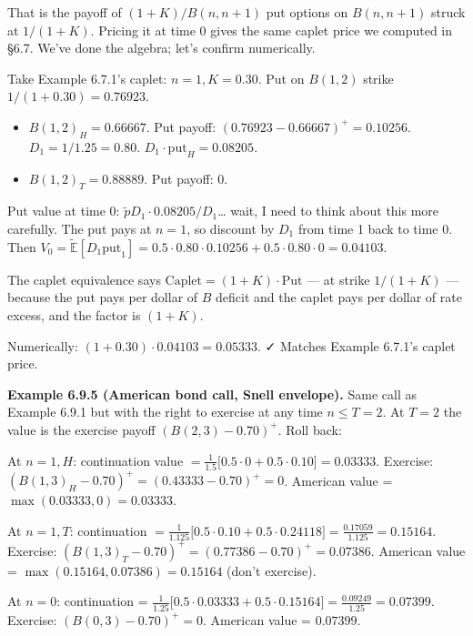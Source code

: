 \documentclass[
  10pt,
  twoside]{book}
\providecommand{\tightlist}{%
  \setlength{\itemsep}{0pt}\setlength{\parskip}{0pt}}
\begin{document}
That is the payoff of \((1 + K)/B(n, n+1)\) put options on \(B(n, n+1)\)
struck at \(1/(1 + K)\). Pricing it at time 0 gives the same caplet
price we computed in §6.7. We've done the algebra; let's confirm
numerically.

Take Example 6.7.1's caplet: \(n = 1, K = 0.30\). Put on \(B(1, 2)\)
strike \(1/(1 + 0.30) = 0.76923\).

\begin{itemize}
\tightlist
\item
  \(B(1, 2)_H = 0.66667\). Put payoff:
  \((0.76923 - 0.66667)^+ = 0.10256\). \(D_1 = 1/1.25 = 0.80\).
  \(D_1 \cdot \text{put}_H = 0.08205\).
\item
  \(B(1, 2)_T = 0.88889\). Put payoff: \(0\).
\end{itemize}

Put value at time 0: \(\tilde p D_1 \cdot 0.08205 / D_1\)\ldots{} wait,
I need to think about this more carefully. The put pays at \(n = 1\), so
discount by \(D_1\) from time 1 back to time 0. Then
\(V_0 = \tilde{\mathbb E}[D_1 \text{put}_1] = 0.5 \cdot 0.80 \cdot 0.10256 + 0.5 \cdot 0.80 \cdot 0 = 0.04103\).

The caplet equivalence says \(\text{Caplet} = (1 + K) \cdot \text{Put}\)
--- at strike \(1/(1+K)\) --- because the put pays per dollar of \(B\)
deficit and the caplet pays per dollar of rate excess, and the factor is
\((1+K)\).

Numerically: \((1 + 0.30) \cdot 0.04103 = 0.05333\). ✓ Matches Example
6.7.1's caplet price.

\textbf{Example 6.9.5 (American bond call, Snell envelope).} Same call
as Example 6.9.1 but with the right to exercise at any time
\(n \le T = 2\). At \(T = 2\) the value is the exercise payoff
\((B(2, 3) - 0.70)^+\). Roll back:

At \(n = 1, H\): continuation value
\(= \tfrac{1}{1.5}\bigl[0.5 \cdot 0 + 0.5 \cdot 0.10\bigr] = 0.03333\).
Exercise: \((B(1, 3)_H - 0.70)^+ = (0.43333 - 0.70)^+ = 0\). American
value = \(\max(0.03333, 0) = 0.03333\).

At \(n = 1, T\): continuation
\(= \tfrac{1}{1.125}\bigl[0.5 \cdot 0.10 + 0.5 \cdot 0.24118\bigr] = \tfrac{0.17059}{1.125} = 0.15164\).
Exercise: \((B(1, 3)_T - 0.70)^+ = (0.77386 - 0.70)^+ = 0.07386\).
American value = \(\max(0.15164, 0.07386) = 0.15164\) (don't exercise).

At \(n = 0\): continuation =
\(\tfrac{1}{1.25}\bigl[0.5 \cdot 0.03333 + 0.5 \cdot 0.15164\bigr] = \tfrac{0.09249}{1.25} = 0.07399\).
Exercise: \((B(0, 3) - 0.70)^+ = 0\). American value = \(0.07399\).
\end{document}

